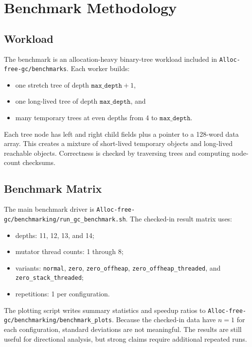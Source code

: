 \documentclass[11pt]{article}
\begin{document}
\section{Benchmark Methodology}

\subsection{Workload}

The benchmark is an allocation-heavy binary-tree workload included in
\texttt{Alloc-free-gc/benchmarks}. Each worker builds:

\begin{itemize}
  \item one stretch tree of depth \(\texttt{max\_depth}+1\),
  \item one long-lived tree of depth \(\texttt{max\_depth}\), and
  \item many temporary trees at even depths from 4 to \(\texttt{max\_depth}\).
\end{itemize}

Each tree node has left and right child fields plus a pointer to a 128-word data
array. This creates a mixture of short-lived temporary objects and long-lived
reachable objects. Correctness is checked by traversing trees and computing
node-count checksums.

\subsection{Benchmark Matrix}

The main benchmark driver is
\texttt{Alloc-free-gc/benchmarking/run\_gc\_benchmark.sh}. The checked-in
result matrix uses:

\begin{itemize}
  \item depths: 11, 12, 13, and 14;
  \item mutator thread counts: 1 through 8;
  \item variants: \texttt{normal}, \texttt{zero}, \texttt{zero\_offheap},
  \texttt{zero\_offheap\_threaded}, and \texttt{zero\_stack\_threaded};
  \item repetitions: 1 per configuration.
\end{itemize}

The plotting script writes summary statistics and speedup ratios to
\texttt{Alloc-free-gc/benchmarking/benchmark\_plots}. Because the checked-in
data have \(n=1\) for each configuration, standard deviations are not meaningful.
The results are still useful for directional analysis, but strong claims require
additional repeated runs.
\end{document}
